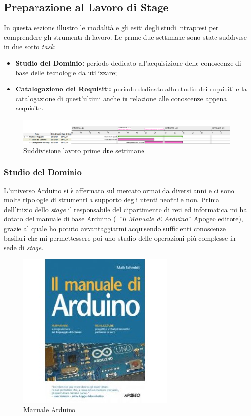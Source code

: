 \subsection{Preparazione al Lavoro di Stage}

In questa sezione illustro le modalità e gli esiti degli studi intrapresi per comprendere gli strumenti di lavoro. Le prime due settimane sono state suddivise in due sotto \textit{task}:

\begin{itemize}
\item \textbf{Studio del Dominio:} periodo dedicato all'acquisizione delle conoscenze di base delle tecnologie da utilizzare;
\item \textbf{Catalogazione dei Requisiti:} periodo dedicato allo studio dei requisiti e la catalogazione di quest'ultimi anche in relazione alle conoscenze appena acquisite.
\end{itemize}

\begin{figure}[htbp]	
\includegraphics[width=1\textwidth]{./capitoli/capitolo3/img/requ}
\caption{Suddivisione lavoro prime due settimane}
\end{figure}





\subsubsection{Studio del Dominio}

L'universo Arduino si è affermato sul mercato ormai da diversi anni e ci sono molte tipologie di strumenti a supporto degli utenti neofiti e non. Prima dell'inizio dello \textit{stage} il responsabile del dipartimento di reti ed informatica mi ha dotato del manuale di base Arduino ( \textit{''Il Manuale di Arduino}'' Apogeo editore), grazie al quale ho potuto avvantaggiarmi acquisendo sufficienti conoscenze basilari che mi permettessero poi uno studio delle operazioni più complesse in sede di \textit{stage}. 

\begin{figure}[htbp]	
\centering
\includegraphics[scale=.5]{./capitoli/capitolo3/img/manuale}
\caption{Manuale Arduino}
\end{figure}

